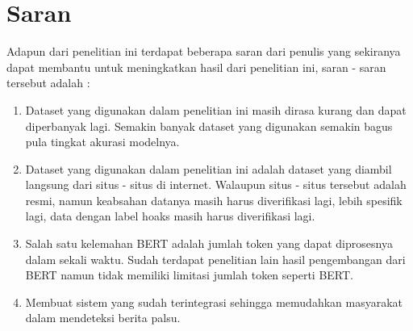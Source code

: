 \section{Saran}
\label{chap:saran}

Adapun dari penelitian ini terdapat beberapa saran dari penulis yang sekiranya dapat membantu untuk meningkatkan hasil dari penelitian ini, saran - saran tersebut adalah :

\begin{enumerate}[nolistsep]

  \item Dataset yang digunakan dalam penelitian ini masih dirasa kurang dan dapat diperbanyak lagi. Semakin banyak dataset yang digunakan semakin bagus pula tingkat akurasi modelnya.
  \item Dataset yang digunakan dalam penelitian ini adalah dataset yang diambil langsung dari situs - situs di internet. Walaupun situs - situs tersebut adalah resmi, namun keabsahan datanya masih harus diverifikasi lagi, lebih spesifik lagi, data dengan label hoaks masih harus diverifikasi lagi.
  \item Salah satu kelemahan BERT adalah jumlah token yang dapat diprosesnya dalam sekali waktu. Sudah terdapat penelitian lain hasil pengembangan dari BERT namun tidak memiliki limitasi jumlah token seperti BERT.
  \item Membuat sistem yang sudah terintegrasi sehingga memudahkan masyarakat dalam mendeteksi berita palsu.

\end{enumerate}
